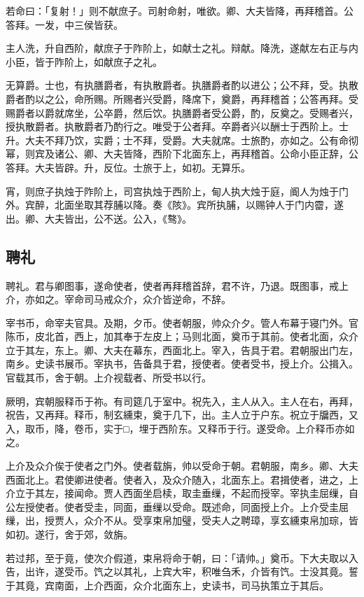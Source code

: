 \documentclass[]{article}
\begin{document}
若命曰：「复射！」则不献庶子。司射命射，唯欲。卿、大夫皆降，再拜稽首。公答拜。一发，中三侯皆获。

主人洗，升自西阶，献庶子于阼阶上，如献士之礼。辩献。降洗，遂献左右正与内小臣，皆于阼阶上，如献庶子之礼。

无算爵。士也，有执膳爵者，有执散爵者。执膳爵者酌以进公；公不拜，受。执散爵者酌以之公，命所赐。所赐者兴受爵，降席下，奠爵，再拜稽首；公答再拜。受赐爵者以爵就席坐，公卒爵，然后饮。执膳爵者受公爵，酌，反奠之。受赐者兴，授执散爵者。执散爵者乃酌行之。唯受于公者拜。卒爵者兴以酬士于西阶上。士升。大夫不拜乃饮，实爵；士不拜，受爵。大夫就席。士旅酌，亦如之。公有命彻幂，则宾及诸公、卿、大夫皆降，西阶下北面东上，再拜稽首。公命小臣正辞，公答拜。大夫皆辟。升，反位。士旅于上，如初。无算乐。

宵，则庶子执烛于阼阶上，司宫执烛于西阶上，甸人执大烛于庭，阍人为烛于门外。宾醉，北面坐取其荐脯以降。奏《陔》。宾所执脯，以赐钟人于门内霤，遂出。卿、大夫皆出，公不送。公入，《骜》。

\hypertarget{header-n40}{%
\subsection{聘礼}\label{header-n40}}

聘礼。君与卿图事，遂命使者，使者再拜稽首辞，君不许，乃退。既图事，戒上介，亦如之。宰命司马戒众介，众介皆逆命，不辞。

宰书币，命宰夫官具。及期，夕币。使者朝服，帅众介夕。管人布幕于寝门外。官陈币，皮北首，西上，加其奉于左皮上；马则北面，奠币于其前。使者北面，众介立于其左，东上。卿、大夫在幕东，西面北上。宰入，告具于君。君朝服出门左，南乡。史读书展币。宰执书，告备具于君，授使者。使者受书，授上介。公揖入。官载其币，舍于朝。上介视载者、所受书以行。

厥明，宾朝服释币于祢。有司筵几于室中。祝先入，主人从入。主人在右，再拜，祝告，又再拜。释币，制玄纁束，奠于几下，出。主人立于户东。祝立于牖西，又入，取币，降，卷币，实于□，埋于西阶东。又释币于行。遂受命。上介释币亦如之。

上介及众介俟于使者之门外。使者载旃，帅以受命于朝。君朝服，南乡。卿、大夫西面北上。君使卿进使者。使者入，及众介随入，北面东上。君揖使者，进之，上介立于其左，接闻命。贾人西面坐启椟，取圭垂缫，不起而授宰。宰执圭屈缫，自公左授使者。使者受圭，同面，垂缫以受命。既述命，同面授上介。上介受圭屈缫，出，授贾人，众介不从。受享束帛加璧，受夫人之聘璋，享玄纁束帛加琮，皆如初。遂行，舍于郊，敛旃。

若过邦，至于竟，使次介假道，束帛将命于朝，曰：「请帅。」奠币。下大夫取以入告，出许，遂受币。饩之以其礼，上宾大牢，积唯刍禾，介皆有饩。士没其竟。誓于其竟，宾南面，上介西面，众介北面东上，史读书，司马执策立于其后。
\end{document}
